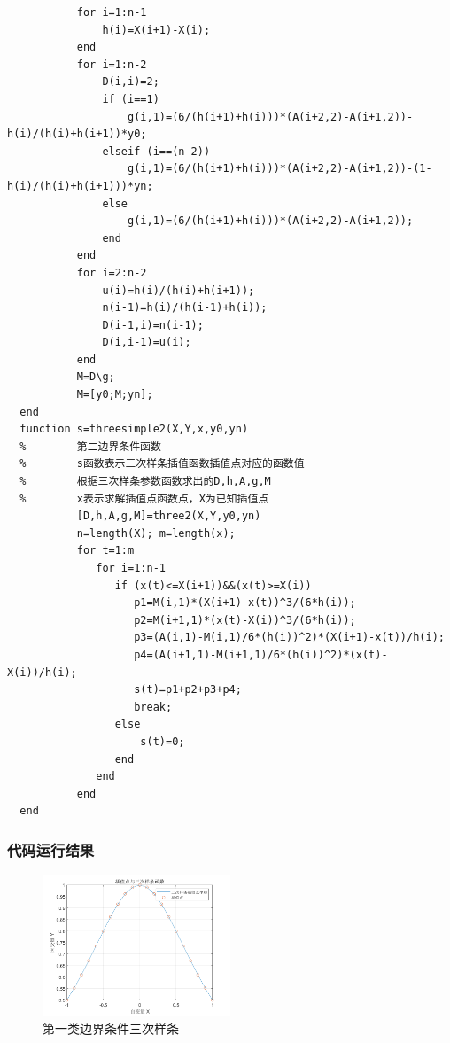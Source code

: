 \documentclass[UTF8,a4paper,10pt]{ctexart}
\begin{document}
\begin{lstlisting}
           for i=1:n-1
               h(i)=X(i+1)-X(i);
           end        
           for i=1:n-2
               D(i,i)=2;
               if (i==1)
                   g(i,1)=(6/(h(i+1)+h(i)))*(A(i+2,2)-A(i+1,2))-h(i)/(h(i)+h(i+1))*y0;
               elseif (i==(n-2))
                   g(i,1)=(6/(h(i+1)+h(i)))*(A(i+2,2)-A(i+1,2))-(1-h(i)/(h(i)+h(i+1)))*yn;
               else
                   g(i,1)=(6/(h(i+1)+h(i)))*(A(i+2,2)-A(i+1,2));
               end             
           end
           for i=2:n-2
               u(i)=h(i)/(h(i)+h(i+1));
               n(i-1)=h(i)/(h(i-1)+h(i));
               D(i-1,i)=n(i-1);
               D(i,i-1)=u(i);             
           end
           M=D\g;
           M=[y0;M;yn];         
  end
  function s=threesimple2(X,Y,x,y0,yn)
  %        第二边界条件函数 
  %        s函数表示三次样条插值函数插值点对应的函数值
  %        根据三次样条参数函数求出的D,h,A,g,M
  %        x表示求解插值点函数点，X为已知插值点        
           [D,h,A,g,M]=three2(X,Y,y0,yn)
           n=length(X); m=length(x);    
           for t=1:m
              for i=1:n-1
                 if (x(t)<=X(i+1))&&(x(t)>=X(i))
                    p1=M(i,1)*(X(i+1)-x(t))^3/(6*h(i));
                    p2=M(i+1,1)*(x(t)-X(i))^3/(6*h(i));
                    p3=(A(i,1)-M(i,1)/6*(h(i))^2)*(X(i+1)-x(t))/h(i);
                    p4=(A(i+1,1)-M(i+1,1)/6*(h(i))^2)*(x(t)-X(i))/h(i);
                    s(t)=p1+p2+p3+p4; 
                    break;
                 else
                     s(t)=0; 
                 end
              end
           end
  end
\end{lstlisting}
\subsubsection{代码运行结果}
	\begin{figure}[!htbp]
		\centering
		\includegraphics[width=0.5\textwidth,height=0.375\textwidth]{pictures/3sp1.png}
		\caption{第一类边界条件三次样条} \label{3sp1}
	\end{figure}
\end{document}
